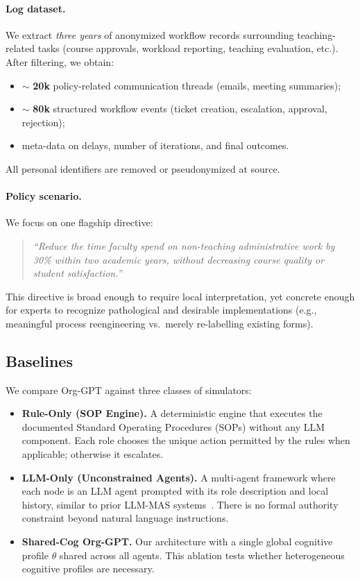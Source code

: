 \documentclass{article}
\begin{document}
\paragraph{Log dataset.}
We extract \emph{three years} of anonymized workflow records surrounding teaching-related tasks (course approvals, workload reporting, teaching evaluation, etc.). After filtering, we obtain:
\begin{itemize}
    \item $\sim$ \textbf{20k} policy-related communication threads (emails, meeting summaries); 
    \item $\sim$ \textbf{80k} structured workflow events (ticket creation, escalation, approval, rejection);
    \item meta-data on delays, number of iterations, and final outcomes.
\end{itemize}
All personal identifiers are removed or pseudonymized at source.

\paragraph{Policy scenario.}
We focus on one flagship directive:

\begin{quote}
    \emph{``Reduce the time faculty spend on non-teaching administrative work by 30\% within two academic years, without decreasing course quality or student satisfaction.''}
\end{quote}

This directive is broad enough to require local interpretation, yet concrete enough for experts to recognize pathological and desirable implementations (e.g., meaningful process reengineering vs.\ merely re-labelling existing forms).

\subsection{Baselines}

We compare Org-GPT against three classes of simulators:

\begin{itemize}
    \item \textbf{Rule-Only (SOP Engine).} A deterministic engine that executes the documented Standard Operating Procedures (SOPs) without any LLM component. Each role chooses the unique action permitted by the rules when applicable; otherwise it escalates.
    \item \textbf{LLM-Only (Unconstrained Agents).} A multi-agent framework where each node is an LLM agent prompted with its role description and local history, similar to prior LLM-MAS systems~\citep{park2023generative,hong2023metagpt}. There is no formal authority constraint beyond natural language instructions.
    \item \textbf{Shared-Cog Org-GPT.} Our architecture with a single global cognitive profile $\theta$ shared across all agents. This ablation tests whether heterogeneous cognitive profiles are necessary.
\end{itemize}
\end{document}
